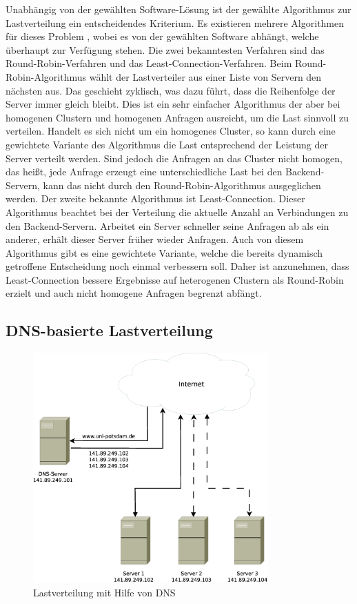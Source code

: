 \documentclass[a4paper, 12pt, BCOR10mm, DIV12, toc=bibliography, toc=listof, german]{scrbook}
\begin{document}
			Unabhängig von der gewählten Software-Lösung ist der gewählte Algorithmus zur Lastverteilung
			ein entscheidendes Kriterium. Es existieren mehrere Algorithmen für dieses Problem
			\cite{zinke2007}, wobei es von der gewählten Software abhängt, welche überhaupt zur Verfügung
			stehen.  Die zwei bekanntesten Verfahren sind das Round-Robin-Verfahren und das
			Least-Connection-Verfahren. Beim Round-Robin-Algorithmus wählt der Lastverteiler aus einer
			Liste von Servern den nächsten aus. Das geschieht zyklisch, was dazu führt, dass die
			Reihenfolge der Server immer gleich bleibt. Dies ist ein sehr einfacher Algorithmus der aber
			bei homogenen Clustern und homogenen Anfragen ausreicht, um die Last sinnvoll zu verteilen.
			Handelt es sich nicht um ein homogenes Cluster, so kann durch eine gewichtete Variante des
			Algorithmus die Last entsprechend der Leistung der Server verteilt werden. Sind jedoch die
			Anfragen an das Cluster nicht homogen, das heißt, jede Anfrage erzeugt eine unterschiedliche
			Last bei den Backend-Servern, kann das nicht durch den Round-Robin-Algorithmus ausgeglichen
			werden. Der zweite bekannte Algorithmus ist Least-Connection. Dieser Algorithmus beachtet bei
			der Verteilung die aktuelle Anzahl an Verbindungen zu den Backend-Servern. Arbeitet ein Server
			schneller seine Anfragen ab als ein anderer, erhält dieser Server früher wieder
			Anfragen. Auch von diesem Algorithmus gibt es eine gewichtete Variante, welche die bereits
			dynamisch getroffene Entscheidung noch einmal verbessern soll. Daher ist anzunehmen, dass
			Least-Connection bessere Ergebnisse auf heterogenen Clustern als Round-Robin erzielt und auch
			nicht homogene Anfragen begrenzt abfängt.


			\subsection{DNS-basierte Lastverteilung} %
			\label{sub:dns-lastverteilung}

			\begin{figure}
				\centering
				\includegraphics[width=9cm]{images/dns-loadbalancer}
				\caption{Lastverteilung mit Hilfe von DNS}
				\label{fig:lastverteilung-dns}
			\end{figure}
\end{document}
